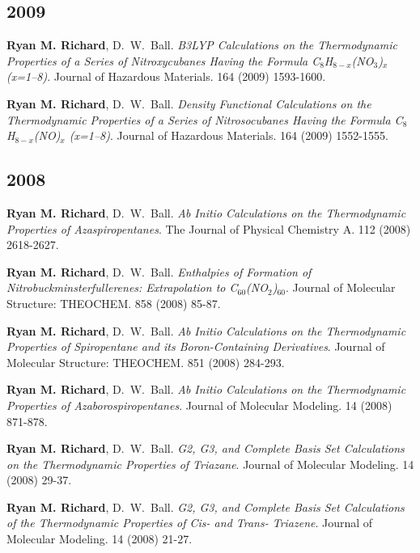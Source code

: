 \documentclass[11pt,a4paper,sans]{moderncv}
\begin{document}
\begin{etaremune}
	\subsection{2009}
	\item{\textbf{Ryan M. Richard}, D.~W.~Ball. {\em B3LYP Calculations on the 
	      Thermodynamic Properties of a Series of Nitroxycubanes Having the 
		  Formula C$_8$H$_{8-x}$(NO$_3$)$_x$ (x=1--8)}.  Journal of Hazardous 
		  Materials.  164 (2009) 1593-1600.}
	\item{\textbf{Ryan M. Richard}, D.~W.~Ball.  {\em Density Functional 
	      Calculations on the Thermodynamic Properties of a Series of 
		  Nitrosocubanes Having the Formula C$_8$H$_{8-x}$(NO)$_x$ (x=1--8)}.  
		  Journal of Hazardous Materials. 164 (2009) 1552-1555.}

	\subsection{2008}
	\item{\textbf{Ryan M. Richard}, D.~W.~Ball.  {\em  Ab Initio Calculations on
	      the Thermodynamic Properties of Azaspiropentanes}.  The Journal of 
		  Physical Chemistry A.  112 (2008) 2618-2627.}
	\item{\textbf{Ryan M. Richard}, D.~W.~Ball. {\em Enthalpies of Formation of 
	      Nitrobuckminsterfullerenes: Extrapolation to C$_{60}$(NO$_2$)$_{60}$}.  
		  Journal of Molecular Structure: THEOCHEM.  858 (2008) 85-87.}
	\item{\textbf{Ryan M. Richard}, D.~W.~Ball. {\em Ab Initio Calculations on 
	      the Thermodynamic Properties of Spiropentane and its Boron-Containing 
		  Derivatives}.  Journal of Molecular Structure: THEOCHEM.  851 (2008) 
		  284-293.}
	\item{\textbf{Ryan M. Richard}, D.~W.~Ball. {\em Ab Initio Calculations on 
	      the Thermodynamic Properties of Azaborospiropentanes}.  Journal of 
		  Molecular Modeling. 14 (2008) 871-878. }
	\item{\textbf{Ryan M. Richard}, D.~W.~Ball. {\em G2, G3, and Complete Basis 
	      Set Calculations on the Thermodynamic Properties of Triazane}.  
		  Journal of Molecular Modeling.  14 (2008) 29-37.}
	\item{\textbf{Ryan M. Richard}, D.~W.~Ball. {\em G2, G3, and Complete Basis 
	      Set Calculations of the Thermodynamic Properties of Cis- and Trans-
		  Triazene}.  Journal of Molecular Modeling.  14 (2008) 21-27.}
	

\end{etaremune}
\end{document}
